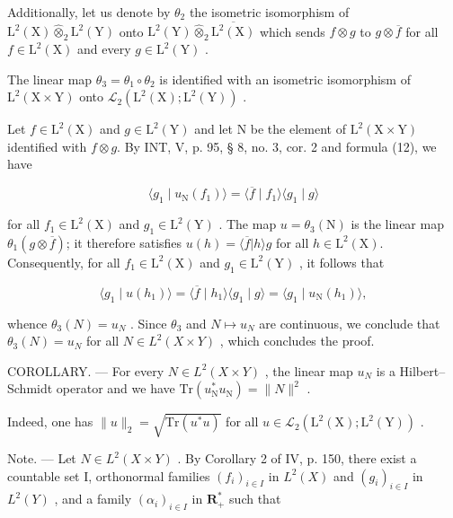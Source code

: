 Additionally, let us denote by \(\theta_{2}\) the isometric isomorphism of \(\mathrm{L}^{2}(\mathrm{X})\widehat{\otimes}_{2}\mathrm{L}^{2}(\mathrm{Y})\) onto \(\mathrm{L}^{2}(\mathrm{Y})\widehat{\otimes}_{2}\overline{\mathrm{L}^{2}(\mathrm{X})}\) which sends \(f\otimes g\) to \(g\otimes \overline{f}\) for all \(f\in \mathrm{L}^2 (\mathrm{X})\) and every \(g\in \mathrm{L}^2 (\mathrm{Y})\) .

The linear map \(\theta_{3} = \theta_{1} \circ \theta_{2}\) is identified with an isometric isomorphism of \(\mathrm{L}^{2}(\mathrm{X} \times \mathrm{Y})\) onto \(\mathcal{L}_{2}(\mathrm{L}^{2}(\mathrm{X}); \mathrm{L}^{2}(\mathrm{Y}))\) .

Let \(f \in \mathrm{L}^2(\mathrm{X})\) and \(g \in \mathrm{L}^2(\mathrm{Y})\) and let \(\mathrm{N}\) be the element of \(\mathrm{L}^2(\mathrm{X} \times \mathrm{Y})\) identified with \(f \otimes g\). By INT, V, p. 95, § 8, no. 3, cor. 2 and formula (12), we have

\[
\langle g _ {1} \mid u _ {\mathrm{N}} (f _ {1}) \rangle = \langle \overline {{f}} \mid f _ {1} \rangle \langle g _ {1} \mid g \rangle
\]

for all \(f_1 \in \mathrm{L}^2(\mathrm{X})\) and \(g_1 \in \mathrm{L}^2(\mathrm{Y})\) . The map \(u = \theta_3(\mathrm{N})\) is the linear map \(\theta_1(g \otimes \overline{f})\); it therefore satisfies \(u(h) = \langle \overline{f} | h \rangle g\) for all \(h \in \mathrm{L}^2(\mathrm{X})\). Consequently, for all \(f_1 \in \mathrm{L}^2(\mathrm{X})\) and \(g_1 \in \mathrm{L}^2(\mathrm{Y})\) , it follows that

\[
\langle g _ {1} \mid u (h _ {1}) \rangle = \langle \overline {{f}} \mid h _ {1} \rangle \langle g _ {1} \mid g \rangle = \langle g _ {1} \mid u _ {\mathrm{N}} (h _ {1}) \rangle ,
\]

whence \(\theta_3(N) = u_N\) . Since \(\theta_3\) and \(N \mapsto u_N\) are continuous, we conclude that \(\theta_3(N) = u_N\) for all \(N \in L^2(X \times Y)\) , which concludes the proof.

COROLLARY. --- For every \(N \in L^{2}(X \times Y)\) , the linear map \(u_{N}\) is a Hilbert--Schmidt operator and we have \(\mathrm{Tr}(u_{\mathrm{N}}^{*}u_{\mathrm{N}}) = \|N\|^{2}\) .

Indeed, one has \(\| u\| _2 = \sqrt{\mathrm{Tr}(u^*u)}\) for all \(u\in \mathcal{L}_2(\mathrm{L}^2 (\mathrm{X});\mathrm{L}^2 (\mathrm{Y}))\) .

Note. --- Let \(N \in L^{2}(X \times Y)\) . By Corollary 2 of IV, p. 150, there exist a countable set I, orthonormal families \((f_{i})_{i \in I}\) in \(L^{2}(X)\) and \((g_{i})_{i \in I}\) in \(L^{2}(Y)\) , and a family \((\alpha_{i})_{i \in I}\) in \(\mathbf{R}_{+}^{*}\) such that

